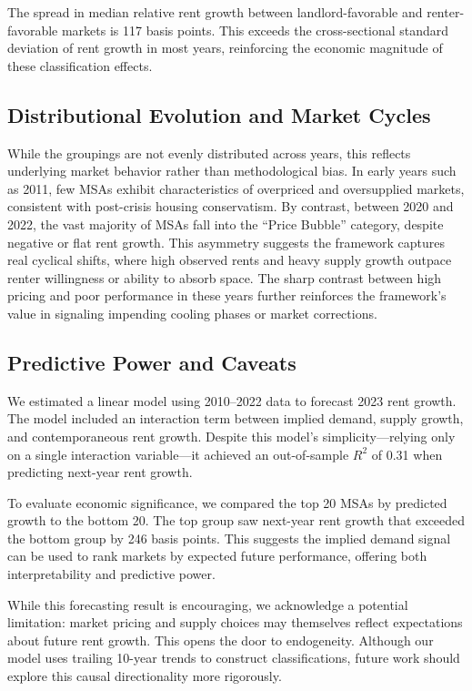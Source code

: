 \documentclass[sn-mathphys-num]{sn-jnl}%
\theoremstyle{thmstyleone}%
\theoremstyle{thmstyletwo}%
\theoremstyle{thmstylethree}%
\begin{document}
The spread in median relative rent growth between landlord-favorable and renter-favorable markets is 117 basis points. This exceeds the cross-sectional standard deviation of rent growth in most years, reinforcing the economic magnitude of these classification effects.

\subsection{Distributional Evolution and Market Cycles}

While the groupings are not evenly distributed across years, this reflects underlying market behavior rather than methodological bias. In early years such as 2011, few MSAs exhibit characteristics of overpriced and oversupplied markets, consistent with post-crisis housing conservatism. By contrast, between 2020 and 2022, the vast majority of MSAs fall into the “Price Bubble” category, despite negative or flat rent growth. This asymmetry suggests the framework captures real cyclical shifts, where high observed rents and heavy supply growth outpace renter willingness or ability to absorb space. The sharp contrast between high pricing and poor performance in these years further reinforces the framework’s value in signaling impending cooling phases or market corrections.

\subsection{Predictive Power and Caveats}

We estimated a linear model using 2010--2022 data to forecast 2023 rent growth. The model included an interaction term between implied demand, supply growth, and contemporaneous rent growth. Despite this model’s simplicity—relying only on a single interaction variable—it achieved an out-of-sample $R^2$ of 0.31 when predicting next-year rent growth.

To evaluate economic significance, we compared the top 20 MSAs by predicted growth to the bottom 20. The top group saw next-year rent growth that exceeded the bottom group by 246 basis points. This suggests the implied demand signal can be used to rank markets by expected future performance, offering both interpretability and predictive power.

While this forecasting result is encouraging, we acknowledge a potential limitation: market pricing and supply choices may themselves reflect expectations about future rent growth. This opens the door to endogeneity. Although our model uses trailing 10-year trends to construct classifications, future work should explore this causal directionality more rigorously.
\end{document}
